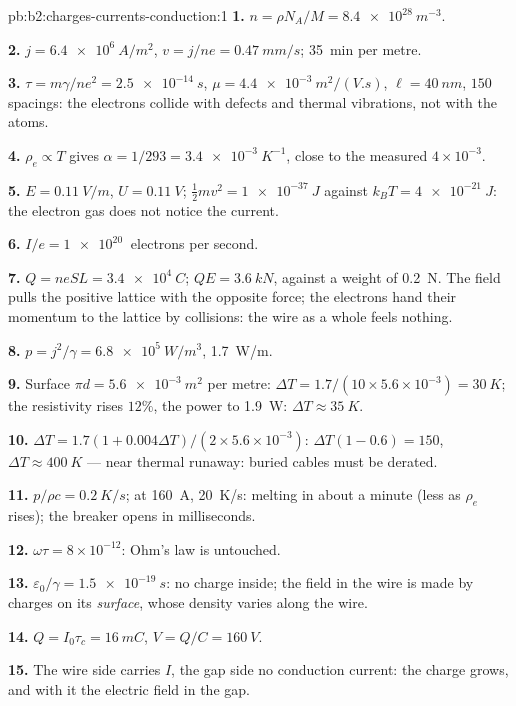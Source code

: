 \begin{solution}{pb:b2:charges-currents-conduction:1}
\textbf{1.} $n = \rho N_A/M = \qty{8.4e28}{m^{-3}}$.

\textbf{2.} $j = \qty{6.4e6}{A/m^2}$, $v = j/ne = \qty{0.47}{mm/s}$; \qty{35}{min} per metre.

\textbf{3.} $\tau = m\gamma/ne^2 = \qty{2.5e-14}{s}$, $\mu = \qty{4.4e-3}{m^2/(V.s)}$, $\ell =
\qty{40}{nm}$, $150$ spacings: the electrons collide with defects and
thermal vibrations, not with the atoms.

\textbf{4.} $\rho_e \propto T$ gives $\alpha = 1/293 = \qty{3.4e-3}{K^{-1}}$, close to the
measured $4 \times 10^{-3}$.

\textbf{5.} $E = \qty{0.11}{V/m}$, $U = \qty{0.11}{V}$; $\tfrac12mv^2 = \qty{1e-37}{J}$ against
$k_BT = \qty{4e-21}{J}$: the electron gas does not notice the current.

\textbf{6.} $I/e = \qty{1e20}{}$ electrons per second.

\textbf{7.} $Q = neSL = \qty{3.4e4}{C}$; $QE = \qty{3.6}{kN}$, against a weight of
\qty{0.2}{N}. The field pulls the positive lattice with the opposite
force; the electrons hand their momentum to the lattice by collisions:
the wire as a whole feels nothing.

\textbf{8.} $p = j^2/\gamma = \qty{6.8e5}{W/m^3}$, \qty{1.7}{W/m}.

\textbf{9.} Surface $\pi d = \qty{5.6e-3}{m^2}$ per metre: $\Delta T = 1.7/(10 \times 5.6 \times
10^{-3}) = \qty{30}{K}$; the resistivity rises $12\%$, the power to \qty{1.9}{W}:
$\Delta T \approx \qty{35}{K}$.

\textbf{10.} $\Delta T = 1.7(1 + 0.004\Delta T)/(2 \times 5.6 \times 10^{-3})$: $\Delta T(1 - 0.6) = 150$,
$\Delta T \approx \qty{400}{K}$ --- near thermal runaway: buried cables must be
derated.

\textbf{11.} $p/\rho c = \qty{0.2}{K/s}$; at \qty{160}{A}, \qty{20}{K/s}: melting in
about a minute (less as $\rho_e$ rises); the breaker opens in milliseconds.

\textbf{12.} $\omega\tau = 8 \times 10^{-12}$: Ohm's law is untouched.

\textbf{13.} $\varepsilon_0/\gamma = \qty{1.5e-19}{s}$: no charge inside; the field in the
wire is made by charges on its \emph{surface}, whose density varies
along the wire.

\textbf{14.} $Q = I_0\tau_c = \qty{16}{mC}$, $V = Q/C = \qty{160}{V}$.

\textbf{15.} The wire side carries $I$, the gap side no conduction
current: the charge grows, and with it the electric field in the gap.


\end{solution}
